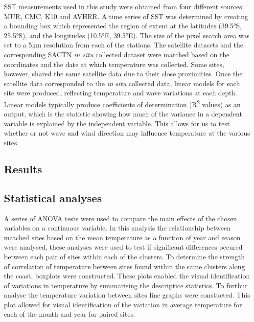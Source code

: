 \documentclass[12pt,a4paper,]{article}
\begin{document}
SST measurements used in this study were obtained from four different
sources: MUR, CMC, K10 and AVHRR. A time series of SST was determined by
creating a bounding box which represented the region of extent at the
latitudes (39.5°S, 25.5°S), and the longitudes (10.5°E, 39.5°E). The
size of the pixel search area was set to a 5km resolution from each of
the stations. The satellite datasets and the corresponding SACTN
\emph{in situ} collected dataset were matched based on the coordinates
and the date at which temperature was collected. Some sites, however,
shared the same satellite data due to their close proximities. Once the
satellite data corresponded to the \emph{in situ} collected data, linear
models for each site were produced, reflecting temperature and wave
variations at each depth. Linear models typically produce coefficients
of determination (R\textsuperscript{2} values) as an output, which is
the statistic showing how much of the variance in a dependent variable
is explained by the independent variable. This allows for us to test
whether or not wave and wind direction may influence temperature at the
various sites.

\hypertarget{results}{%
\subsection{Results}\label{results}}

\hypertarget{statistical-analyses}{%
\subsection{Statistical analyses}\label{statistical-analyses}}

A series of ANOVA tests were used to compare the main effects of the
chosen variables on a continuous variable. In this analysis the
relationship between matched sites based on the mean temperature as a
function of year and season were analysed, these analyses were used to
test if significant differences occured between each pair of sites
within each of the clusters. To determine the strength of correlation of
temperature between sites found within the same clusters along the
coast, boxplots were constructed. These plots enabled the visual
identification of variations in temperature by summarising the
descriptice statistics. To furthur analyse the temperature variation
between sites line graphs were constucted. This plot allowed for visual
identification of the variation in average temperature for each of the
month and year for paired sites.
\end{document}
